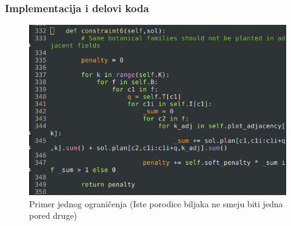 \documentclass{beamer}
\begin{document}
\begin{frame}

  \frametitle{Implementacija i delovi koda}

  \begin{figure}
    \includegraphics[height=0.7\textheight]{slike/constraint6.png}
    \caption{Primer jednog ograničenja (Iste porodice biljaka ne smeju biti jedna pored druge)}
  \end{figure}

\end{frame}
\end{document}
